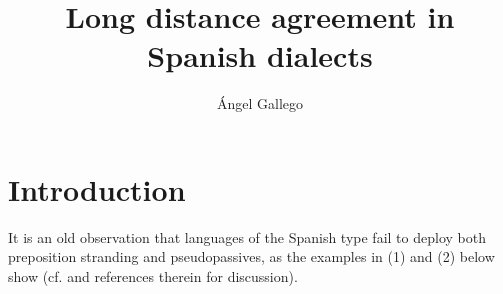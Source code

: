 \documentclass[output=paper]{langsci/langscibook}
\author{Ángel Gallego\affiliation{Universitat Autònoma de Barcelona}}
\title{Long distance agreement in Spanish dialects}
\begin{document}
 

 

 

 

 

 

 

 

 

 

 


\section{Introduction}%

It is an old observation that languages of the Spanish type fail to deploy both preposition stranding and pseudopassives, as the examples in (1) and (2) below show (cf. \citealt{Law2006} and references therein for discussion). 

    \z
\end{document}
